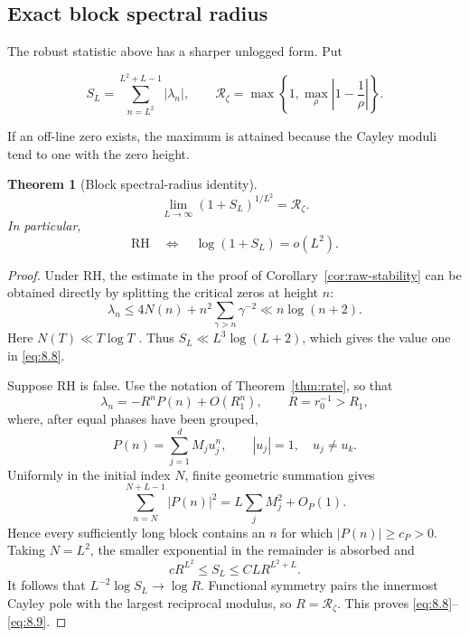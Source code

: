 \documentclass[11pt]{amsart}
\numberwithin{equation}{section}
\newtheorem{theorem}{Theorem}[section]
\theoremstyle{definition}
\theoremstyle{remark}
\newcommand{\RH}{\mathrm{RH}}
\begin{document}
\subsection{Exact block spectral radius}

The robust statistic above has a sharper unlogged form. Put

\begin{equation}
 S_L=\sum_{n=L^2}^{L^2+L-1}|\lambda_n|,
 \qquad
 \mathcal R_\zeta
 =\max\left\{1,\max_\rho\left|1-\frac1\rho\right|\right\}.
                                                               \label{eq:8.7}
\end{equation}

If an off-line zero exists, the maximum is attained because the Cayley
moduli tend to one with the zero height.

\begin{theorem}[Block spectral-radius identity]
\label{thm:block-radius}
\begin{equation}
 \boxed{
 \lim_{L\to\infty}(1+S_L)^{1/L^2}=\mathcal R_\zeta.}    \label{eq:8.8}
\end{equation}
In particular,
\begin{equation}
 \boxed{
 \RH\quad\Longleftrightarrow\quad
 \log(1+S_L)=o(L^2).}                                   \label{eq:8.9}
\end{equation}
\end{theorem}

\begin{proof}
Under RH, the estimate in the proof of
Corollary~\ref{cor:raw-stability} can be obtained directly by splitting the
critical zeros at height \(n\):
\[
 \lambda_n
 \le4N(n)+n^2\sum_{\gamma>n}\gamma^{-2}
 \ll n\log(n+2).
\]
Here \(N(T)\ll T\log T\) \cite{Titchmarsh}.
Thus \(S_L\ll L^3\log(L+2)\), which gives the value one in \eqref{eq:8.8}.

Suppose RH is false. Use the notation of Theorem~\ref{thm:rate}, so that
\[
 \lambda_n=-R^nP(n)+O(R_1^n),
 \qquad R=r_0^{-1}>R_1,
\]
where, after equal phases have been grouped,
\[
 P(n)=\sum_{j=1}^dM_ju_j^n,\qquad |u_j|=1,\quad u_j\ne u_k.
\]
Uniformly in the initial index \(N\), finite geometric summation gives
\begin{equation}
 \sum_{n=N}^{N+L-1}|P(n)|^2
 =L\sum_jM_j^2+O_P(1).                                  \label{eq:8.10}
\end{equation}
Hence every sufficiently long block contains an \(n\) for which
\(|P(n)|\ge c_P>0\). Taking \(N=L^2\), the smaller exponential in the
remainder is absorbed and
\begin{equation}
 cR^{L^2}\le S_L\le CL R^{L^2+L}.                       \label{eq:8.11}
\end{equation}
It follows that \(L^{-2}\log S_L\to\log R\). Functional symmetry pairs
the innermost Cayley pole with the largest reciprocal modulus, so
\(R=\mathcal R_\zeta\). This proves \eqref{eq:8.8}--\eqref{eq:8.9}.
\end{proof}
\end{document}
